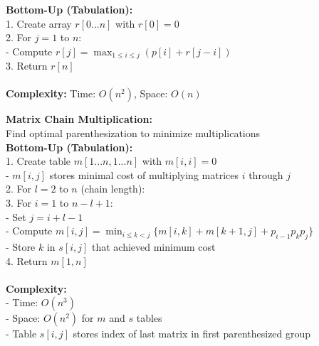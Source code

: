 {{\begin{minipage}[t]{\textwidth}
\begin{minipage}[t]{0.32\textwidth}
\textbf{Bottom-Up (Tabulation):}\\
1. Create array $r[0...n]$ with $r[0] = 0$\\
2. For $j = 1$ to $n$:\\
- Compute $r[j] = \max_{1\leq i\leq j}(p[i] + r[j-i])$\\
3. Return $r[n]$\\[2pt]
\\
\textbf{Complexity:} Time: $O(n^2)$, Space: $O(n)$
\end{minipage}
\hfill
\begin{minipage}[t]{0.32\textwidth}
\scriptsize
\textbf{Matrix Chain Multiplication:}\\
Find optimal parenthesization to minimize multiplications\\
\textbf{Bottom-Up (Tabulation):}\\
1. Create table $m[1...n, 1...n]$ with $m[i,i] = 0$\\
   - $m[i,j]$ stores minimal cost of multiplying matrices $i$ through $j$\\
2. For $l = 2$ to $n$ (chain length):\\
3. For $i = 1$ to $n-l+1$:\\
- Set $j = i+l-1$\\
- Compute $m[i,j] = \min_{i\leq k<j} \{m[i,k] + m[k+1,j] + p_{i-1}p_kp_j\}$\\
- Store $k$ in $s[i,j]$ that achieved minimum cost\\
4. Return $m[1,n]$\\[2pt]
\\
\textbf{Complexity:}\\
- Time: $O(n^3)$\\
- Space: $O(n^2)$ for $m$ and $s$ tables\\
- Table $s[i,j]$ stores index of last matrix in first parenthesized group
\end{minipage}
\end{minipage}
}} 